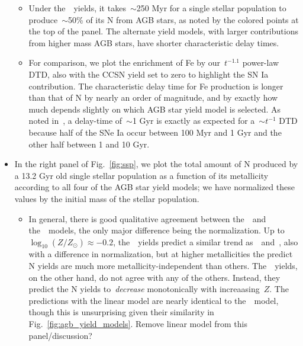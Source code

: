 \documentclass[ms.tex]{subfiles}
\begin{document}
\begin{itemize}
\begin{itemize}
		\item Under the~\cristallo~yields, it takes~$\sim$250 Myr for a single 
		stellar population to produce~$\sim$50\% of its N from AGB stars, as 
		noted by the colored points at the top of the panel. 
		The alternate yield models, with larger contributions from higher mass 
		AGB stars, have shorter characteristic delay times. 

		\item For comparison, we plot the enrichment of Fe by our~$t^{-1.1}$ 
		power-law DTD, also with the CCSN yield set to zero to highlight the 
		SN Ia contribution. 
		The characteristic delay time for Fe production is longer than that of 
		N by nearly an order of magnitude, and by exactly how much depends 
		slightly on which AGB star yield model is selected. 
		As noted in~\citet{Johnson2021}, a delay-time of~$\sim$1 Gyr is exactly 
		as expected for a~$\sim t^{-1}$ DTD because half of the SNe Ia occur 
		between 100 Myr and 1 Gyr and the other half between 1 and 10 Gyr. 
	\end{itemize} 

	\item In the right panel of Fig.~\ref{fig:ssp}, we plot the total amount of 
	N produced by a 13.2 Gyr old single stellar population as a function of 
	its metallicity according to all four of the AGB star yield models; we have 
	normalized these values by the initial mass of the stellar population. 
	\begin{itemize} 
		\item In general, there is good qualitative agreement between 
		the~\cristallo~and the~\ventura~models, the only major difference being 
		the normalization. 
		Up to~$\log_{10}(Z/Z_\odot) \approx -0.2$, the~\karakas~yields predict 
		a similar trend as~\cristallo~and~\ventura, also with a difference in 
		normalization, but at higher metallicities the predict N yields are 
		much more metallicity-independent than others. 
		The~\karakasten~yields, on the other hand, do not agree with any of the 
		others. 
		Instead, they predict the N yields to~\textit{decrease} monotonically 
		with increaasing~$Z$. 
		The predictions with the linear model are nearly identical to 
		the~\cristallo~model, though this is unsurprising given their 
		similarity in Fig.~\ref{fig:agb_yield_models}. 
		{\color{red} Remove linear model from this panel/discussion?} 
	\end{itemize} 
\end{itemize} 
\end{document}
